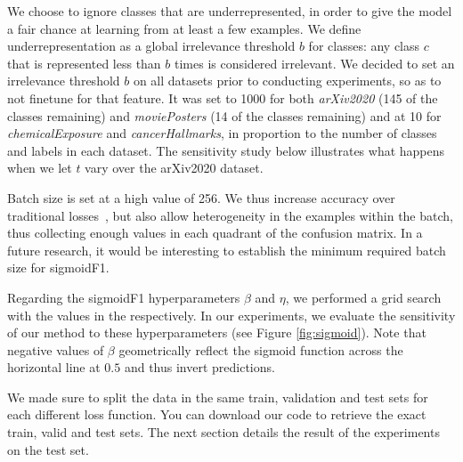 We choose to ignore classes that are underrepresented, in order to give the model a fair chance at learning from at least a few examples. We define underrepresentation as a global irrelevance threshold $b$ for classes: any class $c$ that is represented less than $b$ times is considered irrelevant. We decided to set an irrelevance threshold $b$ on all datasets prior to conducting experiments, so as to not finetune for that feature. It was set to 1000 for both \emph{arXiv2020} (145 of the  classes remaining) and \emph{moviePosters} (14 of the  classes remaining) and at 10 for \emph{chemicalExposure} and \emph{cancerHallmarks}, in proportion to the number of classes and labels in each dataset. The sensitivity study below illustrates what happens when we let $t$ vary over the arXiv2020 dataset.

Batch size is set at a high value of 256. We thus increase accuracy over traditional losses~\cite{bigBS}, but also allow heterogeneity in the examples within the batch, thus collecting enough values in each quadrant of the confusion matrix. In a future research, it would be interesting to establish the minimum required batch size for sigmoidF1. 

Regarding the sigmoidF1 hyperparameters $\beta$ and $\eta$, we performed a grid search with the values in the  respectively. In our experiments, we evaluate the sensitivity of our method to these hyperparameters (see Figure \ref{fig:sigmoid}). Note that negative values of $\beta$ geometrically reflect the sigmoid function across the horizontal line at $0.5$ and thus invert predictions. 

We made sure to split the data in the same train, validation and test sets for each different loss function. You can download our code to retrieve the exact train, valid and test sets. The next section details the result of the experiments on the test set.
 


